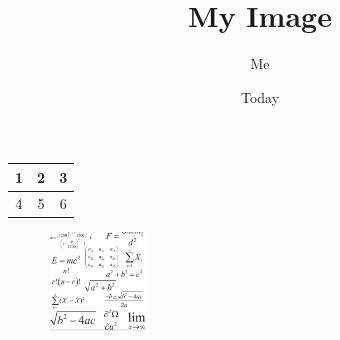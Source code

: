 \documentclass{article}
\title{My Image}
\author{Me}
\date{Today}
\begin{document}
\maketitle
\begin{tabular}{|c|c|c|}
\hline
1 & 2 & 3\\
\hline
4 & 5 & 6\\
\hline
\end{tabular}\begin{figure}
\centering
\includegraphics[width=100px,height=100px]{input.png}
\end{figure}
\end{document}
